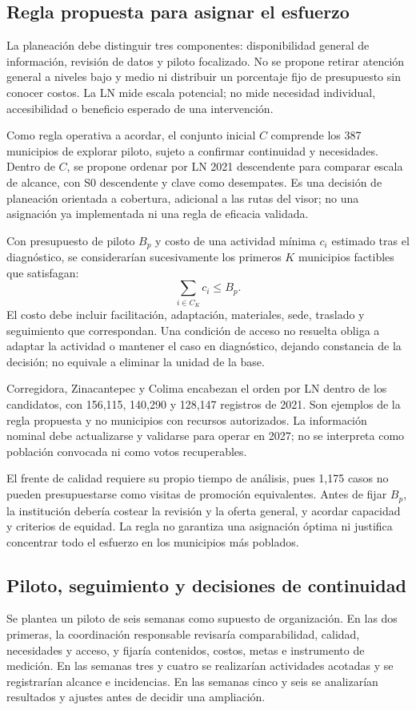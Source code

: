 \documentclass[12pt,a4paper]{article}
\newcommand{\primerparrafo}{\par\noindent\hspace*{1.1em}}
\begin{document}
\clearpage
\subsection{Regla propuesta para asignar el esfuerzo}
\primerparrafo
La planeación debe distinguir tres componentes: disponibilidad general de información, revisión de datos y piloto focalizado. No se propone retirar atención general a niveles bajo y medio ni distribuir un porcentaje fijo de presupuesto sin conocer costos. La LN mide escala potencial; no mide necesidad individual, accesibilidad o beneficio esperado de una intervención.

Como regla operativa a acordar, el conjunto inicial $C$ comprende los 387 municipios de explorar piloto, sujeto a confirmar continuidad y necesidades. Dentro de $C$, se propone ordenar por LN 2021 descendente para comparar escala de alcance, con S0 descendente y clave como desempates. Es una decisión de planeación orientada a cobertura, adicional a las rutas del visor; no una asignación ya implementada ni una regla de eficacia validada.

Con presupuesto de piloto $B_p$ y costo de una actividad mínima $c_i$ estimado tras el diagnóstico, se considerarían sucesivamente los primeros $K$ municipios factibles que satisfagan:
\[
 \sum_{i\in C_K}c_i\leq B_p.
\]
El costo debe incluir facilitación, adaptación, materiales, sede, traslado y seguimiento que correspondan. Una condición de acceso no resuelta obliga a adaptar la actividad o mantener el caso en diagnóstico, dejando constancia de la decisión; no equivale a eliminar la unidad de la base.

Corregidora, Zinacantepec y Colima encabezan el orden por LN dentro de los candidatos, con 156,115, 140,290 y 128,147 registros de 2021. Son ejemplos de la regla propuesta y no municipios con recursos autorizados. La información nominal debe actualizarse y validarse para operar en 2027; no se interpreta como población convocada ni como votos recuperables.

El frente de calidad requiere su propio tiempo de análisis, pues 1,175 casos no pueden presupuestarse como visitas de promoción equivalentes. Antes de fijar $B_p$, la institución debería costear la revisión y la oferta general, y acordar capacidad y criterios de equidad. La regla no garantiza una asignación óptima ni justifica concentrar todo el esfuerzo en los municipios más poblados.

\clearpage
\subsection{Piloto, seguimiento y decisiones de continuidad}
\primerparrafo
Se plantea un piloto de seis semanas como supuesto de organización. En las dos primeras, la coordinación responsable revisaría comparabilidad, calidad, necesidades y acceso, y fijaría contenidos, costos, metas e instrumento de medición. En las semanas tres y cuatro se realizarían actividades acotadas y se registrarían alcance e incidencias. En las semanas cinco y seis se analizarían resultados y ajustes antes de decidir una ampliación.
\end{document}
